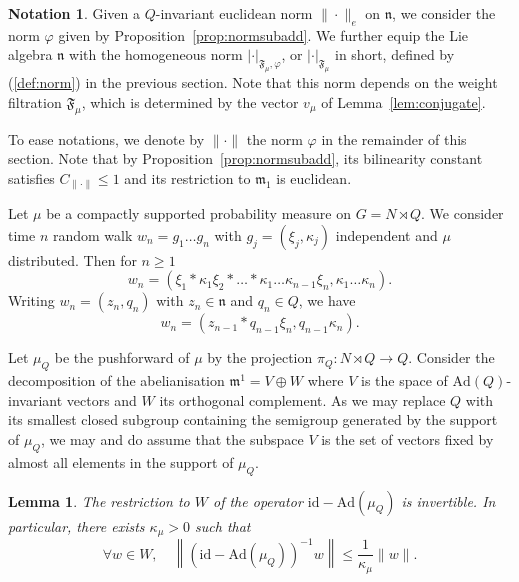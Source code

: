 \documentclass[11pt,leqno]{article}
\theoremstyle{plain}
\newtheorem{lemma}[theorem]{Lemma}
\theoremstyle{definition}
\newtheorem{notation}[theorem]{Notation}
\theoremstyle{remark}
\numberwithin{equation}{section}
\newcommand{\Ad}{\mathrm{Ad}}
\begin{document}
\begin{notation}
Given a $Q$-invariant euclidean norm $\|\cdot\|_e$ on $\mathfrak{n}$, we consider the norm $\varphi$ given by Proposition~\ref{prop:normsubadd}. We further equip the Lie algebra $\mathfrak{n}$ with the homogeneous norm $|\cdot|_{\mathfrak{F}_\mu,\varphi}$, or $|\cdot|_{\mathfrak{F}_\mu}$ in short, defined by (\ref{def:norm}) in the previous section. Note that this norm depends on  the weight filtration $\mathfrak{F}_\mu$, which is determined by the vector $v_\mu$ of Lemma~\ref{lem:conjugate}.

To ease notations, we denote by $\|\cdot\|$ the norm $\varphi$ in the remainder of this section. Note that by Proposition~\ref{prop:normsubadd}, its bilinearity constant satisfies $C_{\|\cdot\|}\le 1$ and its restriction to $\mathfrak{m}_1$ is euclidean.
\end{notation}


Let $\mu$ be a compactly supported probability measure on $G=N \rtimes Q$. We consider time $n$ random walk $w_n=g_1\dots g_n$ with $g_j=(\xi_j,\kappa_j)$ independent and $\mu$ distributed. %
Then for $n\geq 1$
\[
w_n=(\xi_1\ast\kappa_1\xi_2 \ast \dots \ast \kappa_1\dots\kappa_{n-1}\xi_n,\kappa_1\dots\kappa_n).
\]
Writing $w_n=(z_n,q_n)$ with $z_n \in \mathfrak{n}$ and $q_n \in Q$, we have
\[
w_{n}=(z_{n-1} \ast q_{n-1}\xi_n,q_{n-1}\kappa_{n}).
\]

Let $\mu_Q$ be the pushforward of $\mu$ by the projection $\pi_Q:N\rtimes Q \to Q$. Consider the decomposition of the abelianisation $\mathfrak{m}^1=V\oplus W$ where $V$ is the space of $\Ad(Q)$-invariant vectors and $W$ its orthogonal complement. As we may replace $Q$ with its smallest closed subgroup containing the semigroup generated by the support of $\mu_Q$, we may and do assume that the subspace $V$ is the set of vectors fixed by almost all elements in the support of $\mu_Q$. 


\begin{lemma}\label{lem:spectralgap}
The restriction to $W$ of the operator $\mathrm{id}-\Ad(\mu_Q)$ is invertible. In particular, there exists $\kappa_\mu>0$ such that
\begin{equation}\label{eq:gap}
\forall w \in W, \quad \left\|\left(\mathrm{id}-\Ad(\mu_Q)\right)^{-1}w\right\| \le \frac{1}{\kappa_\mu}\|w\|.
\end{equation}
\end{lemma}
\end{document}
